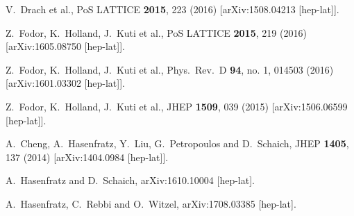 \documentclass[epj]{webofc}
\begin{document}
\begin{thebibliography}{99}
  V.~Drach et al.,
  PoS LATTICE {\bf 2015}, 223 (2016)
  [arXiv:1508.04213 [hep-lat]].



  Z.~Fodor, K.~Holland, J.~Kuti et al.,
  PoS LATTICE {\bf 2015}, 219 (2016)
  [arXiv:1605.08750 [hep-lat]].



  Z.~Fodor, K.~Holland, J.~Kuti et al.,
  Phys.\ Rev.\ D {\bf 94}, no. 1, 014503 (2016)
  [arXiv:1601.03302 [hep-lat]].



  Z.~Fodor, K.~Holland, J.~Kuti et al.,
  JHEP {\bf 1509}, 039 (2015)
  [arXiv:1506.06599 [hep-lat]].



  A.~Cheng, A.~Hasenfratz, Y.~Liu, G.~Petropoulos and D.~Schaich,
  JHEP {\bf 1405}, 137 (2014)
  [arXiv:1404.0984 [hep-lat]].



  A.~Hasenfratz and D.~Schaich,
  arXiv:1610.10004 [hep-lat].



  A.~Hasenfratz, C.~Rebbi and O.~Witzel,
  arXiv:1708.03385 [hep-lat].




\end{thebibliography}
\end{document}
